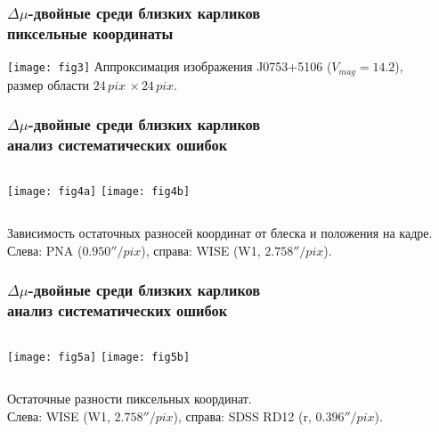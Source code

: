 \begin{frame}
\frametitle{$\Delta\mu$-двойные среди близких карликов\\{\small пиксельные координаты}}
\begin{center}
\texttt{[image: fig3]}
{\footnotesize Аппроксимация изображения J0753+5106 ($V_{mag}=14.2$),\\ размер области $24\,pix\,\times 24\,pix$.}
\end{center}
\end{frame}

\begin{frame}%
\frametitle{$\Delta\mu$-двойные среди близких карликов\\{\small анализ систематических ошибок}}
\begin{center}
\begin{columns}
	\texttt{[image: fig4a]}
	\texttt{[image: fig4b]}
\end{columns}
\end{center}
{\footnotesize Зависимость остаточных разносей координат от блеска и положения на кадре. Слева: PNA ($0.950''/pix$), справа: WISE (W1, $2.758''/pix$). }
\end{frame}


\begin{frame}%
\frametitle{$\Delta\mu$-двойные среди близких карликов\\{\small анализ систематических ошибок}}
\begin{center}
\begin{columns}
	\texttt{[image: fig5a]}
	\texttt{[image: fig5b]}
\end{columns}
\end{center}
{\footnotesize Остаточные разности пиксельных координат.\\ Слева: WISE (W1, $2.758''/pix$), справа: SDSS RD12 (r, $0.396''/pix$). }
\end{frame}



